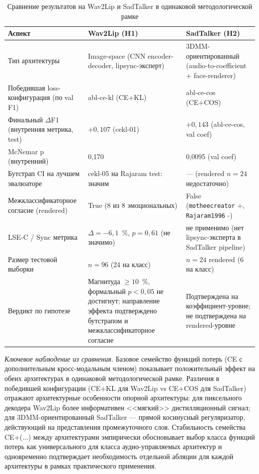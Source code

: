 \documentclass[a4paper, 12pt, oneside, openany]{article}
\begin{document}
\begin{table}[H]
\caption{Сравнение результатов на Wav2Lip и SadTalker в одинаковой методологической рамке}
\label{tab:arch_comparison}
\centering
\small
\begin{tabular}{|p{4.5cm}|p{4.5cm}|p{4.5cm}|}
\hline
\textbf{Аспект} & \textbf{Wav2Lip (H1)} & \textbf{SadTalker (H2)} \\
\hline
Тип архитектуры & Image-space (CNN encoder-decoder, lipsync-эксперт) & 3DMM-ориентированный (audio-to-coefficient + face-renderer) \\
\hline
Победившая loss-конфигурация (по val F1) & abl-ce-kl (CE+KL) & abl-ce-cos (CE+COS) \\
\hline
Финальный $\Delta$F1 (внутренняя метрика, test) & $+0{,}107$ (cekl-01) & $+0{,}143$ (abl-ce-cos, val coef) \\
\hline
McNemar p (внутренний) & 0,170 & 0,0095 (val coef) \\
\hline
Бутстрап CI на лучшем эвалюаторе & cekl-05 на Rajaram test: значим & --- (rendered $n=24$ недостаточно) \\
\hline
Межклассификаторное согласие (rendered) & True (8 из 8 эмоциональных) & False (\texttt{motheecreator} +, \texttt{Rajaram1996} -) \\
\hline
LSE-C / Sync метрика & $\Delta = -6{,}1$~\%, $p=0{,}61$ (не значимо) & не применимо (нет lipsync-эксперта в SadTalker pipeline) \\
\hline
Размер тестовой выборки & $n=96$ (24 на класс) & $n=24$ rendered (6 на класс) \\
\hline
Вердикт по гипотезе & Магнитуда $\geq 10$~\%, формальный $p<0{,}05$ не достигнут; направление эффекта подтверждено бутстрапом и межклассификаторное согласие & Подтверждена на коэффициент-уровне; не подтверждена на rendered-уровне \\
\hline
\end{tabular}
\end{table}

\textit{Ключевое наблюдение из сравнения.} Базовое семейство функций потерь (CE с дополнительным кросс-модальным членом) показывает положительный эффект на обеих архитектурах в одинаковой методологической рамке. Различия в победившей конфигурации (CE+KL для Wav2Lip vs CE+COS для SadTalker) отражают архитектурные особенности опорной архитектуры: для пиксельного декодера Wav2Lip более информативен <<мягкий>> дистилляционный сигнал; для 3DMM-ориентированный SadTalker --- прямой косинусный регуляризатор, действующий на представления промежуточного слоя. Стабильность семейства CE+(...) между архитектурами эмпирически обосновывает выбор класса функций потерь как универсального для класса аудио-управляемых архитектур и одновременно подтверждает необходимость отдельной абляции для каждой архитектуры в рамках практического применения.
\end{document}
